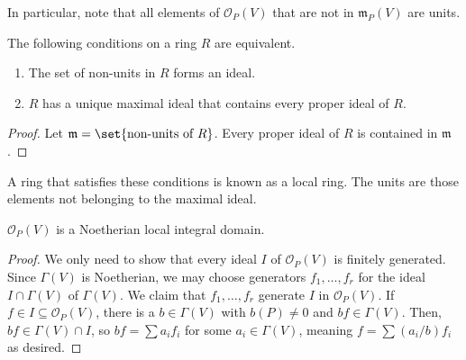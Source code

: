 \documentclass[10pt]{mypackage}
\begin{document}
In particular, note that all elements of $\mathcal{O}_P(V)$ that are not in $\mathfrak{m}_P(V)$ are units.
\begin{lemma}
  The following conditions on a ring $R$ are equivalent.
  \begin{enumerate}[(1)]
    \item The set of non-units in $R$ forms an ideal.
    \item $R$ has a unique maximal ideal that contains every proper ideal of $R$.
  \end{enumerate}
\end{lemma}
\begin{proof}
  Let $\mathfrak{m} = \set{\text{non-units of }R}$. Every proper ideal of $R$ is contained in $\mathfrak{m}$.
\end{proof}
A ring that satisfies these conditions is known as a local ring. The units are those elements not belonging to the maximal ideal. 
\begin{proposition}
  $\mathcal{O}_P(V)$ is a Noetherian local integral domain.
\end{proposition}
\begin{proof}
  We only need to show that every ideal $I$ of $\mathcal{O}_P(V)$ is finitely generated. Since $\Gamma(V)$ is Noetherian, we may choose generators $f_1,\dots,f_r$ for the ideal $I\cap \Gamma(V)$ of $\Gamma(V)$. We claim that $f_1,\dots,f_r$ generate $I$ in $\mathcal{O}_P(V)$. If $f\in I\subseteq \mathcal{O}_P(V)$, there is a $b\in \Gamma(V)$ with $b(P)\neq 0$ and $bf\in \Gamma(V)$. Then, $bf\in \Gamma(V)\cap I$, so $bf = \sum a_if_i$ for some $a_i\in \Gamma(V)$, meaning $f = \sum (a_i/b)f_i$ as desired.
\end{proof}
\end{document}
